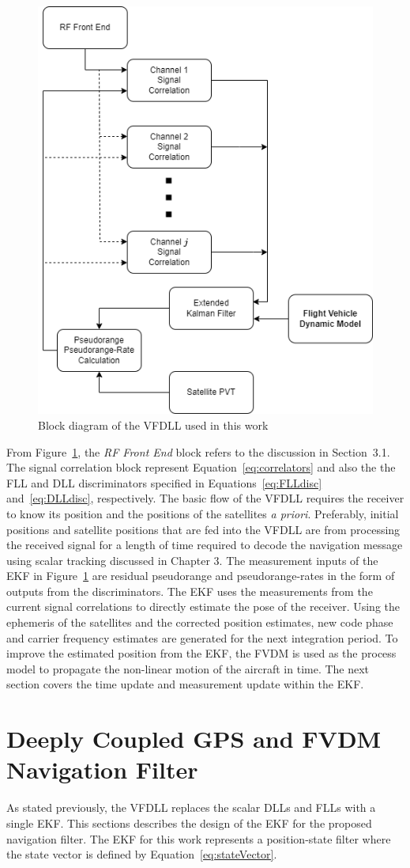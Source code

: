 \begin{figure}[!ht]
    \centering
    \includegraphics[width=0.45\linewidth]{Figures/VectorTracking.drawio.png}
    \caption{Block diagram of the VFDLL used in this work}\label{fig:VFDLL}
\end{figure}

From Figure~\ref{fig:VFDLL}, the \textit{RF Front End} block refers to the discussion in Section~3.1. The signal correlation block represent Equation~\ref{eq:correlators} and also the the FLL and DLL discriminators specified in Equations~\ref{eq:FLLdisc} and~\ref{eq:DLLdisc}, respectively. The basic flow of the VFDLL requires the receiver to know its position and the positions of the satellites \textit{a priori}. Preferably, initial positions and satellite positions that are fed into the VFDLL are from processing the received signal for a length of time required to decode the navigation message using scalar tracking discussed in Chapter 3. The measurement inputs of the EKF in Figure~\ref{fig:VFDLL} are residual pseudorange and pseudorange-rates in the form of outputs from the discriminators. The EKF uses the measurements from the current signal correlations to directly estimate the pose of the receiver. Using the ephemeris of the satellites and the corrected position estimates, new code phase and carrier frequency estimates are generated for the next integration period. To improve the estimated position from the EKF, the FVDM is used as the process model to propagate the non-linear motion of the aircraft in time. The next section covers the time update and measurement update within the EKF\@.

\section{Deeply Coupled GPS and FVDM Navigation Filter}
As stated previously, the VFDLL replaces the scalar DLLs and FLLs with a single EKF\@. This sections describes the design of the EKF for the proposed navigation filter. The EKF for this work represents a position-state filter where the state vector is defined by Equation~\ref{eq:stateVector}.

